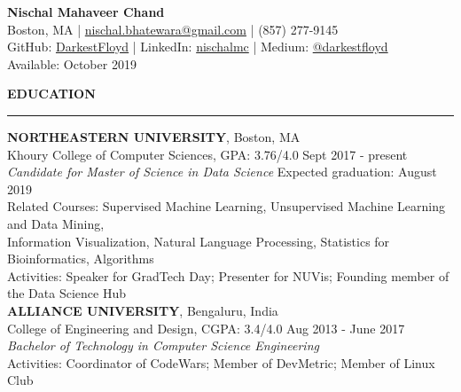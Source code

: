 \documentclass[a4paper]{article}
\newcommand{\myline}{\par
  \kern2pt %
  \hrule height 0.5pt
  \kern2pt %
}
\begin{document}
	\begin{center}
		{\Large \textbf{Nischal Mahaveer Chand}} \\
    Boston, MA | \href{mailto:nischal.bhatewara@gmail.com}{nischal.bhatewara@gmail.com} | 
    (857) 277-9145 \\
                GitHub: \href{https://github.com/DarkestFloyd}{DarkestFloyd} | 
                LinkedIn: \href{https://www.linkedin.com/in/nischalmc}{nischalmc} |
		Medium: \href{https://medium.com/@darkestfloyd}{@darkestfloyd} \\
		Available: October 2019 \\
	\end{center}
	
	\noindent
	{\large \textbf{EDUCATION}}
	\myline 
	\smallskip
	
	\noindent
	\textbf{NORTHEASTERN UNIVERSITY}, Boston, MA \\
	Khoury College of Computer Sciences, GPA: 3.76/4.0 
        \hfill Sept 2017 - present \\
	\textit{Candidate for Master of Science in Data Science} 
        \hfill Expected graduation: August 2019 \\
        Related Courses: Supervised Machine Learning, 
        Unsupervised Machine Learning and Data Mining, \\
        \hspace*{23.9mm} Information Visualization,
        Natural Language Processing, 
        Statistics for Bioinformatics, Algorithms \\
  Activities: Speaker for GradTech Day; Presenter for NUVis; Founding member of the Data Science Hub \\

	\noindent
	\textbf{ALLIANCE UNIVERSITY}, Bengaluru, India \\
  College of Engineering and Design, CGPA: 3.4/4.0 \hfill Aug 2013 - June 2017 \\
	\textit{Bachelor of Technology in Computer Science Engineering} \\
	Activities: Coordinator of CodeWars; Member of DevMetric; Member of Linux Club \\
	
\end{document}
